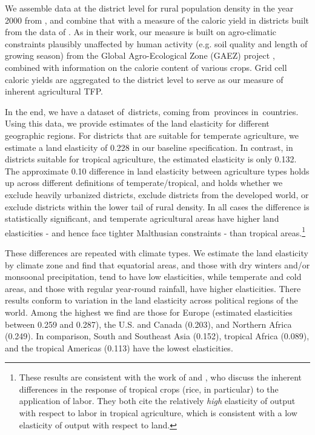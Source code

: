 \documentclass[11pt]{article}
\begin{document}
We assemble data at the district level for rural population density in the year 2000 from \citet{hyde31}, and combine that with a measure of the caloric yield in districts built from the data of \citet{galorozak2016}. As in their work, our measure is built on agro-climatic constraints plausibly unaffected by human activity (e.g. soil quality and length of growing season) from the Global Agro-Ecological Zone (GAEZ) project \citep{gaez}, combined with information on the calorie content of various crops. Grid cell caloric yields are aggregated to the district level to serve as our measure of inherent agricultural TFP.

In the end, we have a dataset of\districts \ districts, coming from\provinces \ provinces in\countries \ countries. Using this data, we provide estimates of the land elasticity for different geographic regions. For districts that are suitable for temperate agriculture, we estimate a land elasticity of 0.228 in our baseline specification. In contrast, in districts suitable for tropical agriculture, the estimated elasticity is only 0.132. The approximate 0.10 difference in land elasticity between agriculture types holds up across different definitions of temperate/tropical, and holds whether we exclude heavily urbanized districts, exclude districts from the developed world, or exclude districts within the lower tail of rural density. In all cases the difference is statistically significant, and temperate agricultural areas have higher land elasticities - and hence face tighter Malthusian constraints - than tropical areas.\footnote{These results are consistent with the work of \citet{Ruthenberg:1976zr} and \citet{bray1994}, who discuss the inherent differences in the response of tropical crops (rice, in particular) to the application of labor. They both cite the relatively \textit{high} elasticity of output with respect to labor in tropical agriculture, which is consistent with a low elasticity of output with respect to land.} 

These differences are repeated with climate types. We estimate the land elasticity by climate zone and find that equatorial areas, and those with dry winters and/or monsoonal precipitation, tend to have low elasticities, while temperate and cold areas, and those with regular year-round rainfall, have higher elasticities. There results conform to variation in the land elasticity across political regions of the world. Among the highest we find are those for Europe (estimated elasticities between 0.259 and 0.287), the U.S. and Canada (0.203), and Northern Africa (0.249). In comparison, South and Southeast Asia (0.152), tropical Africa (0.089), and the tropical Americas (0.113) have the lowest elasticities.
\end{document}
